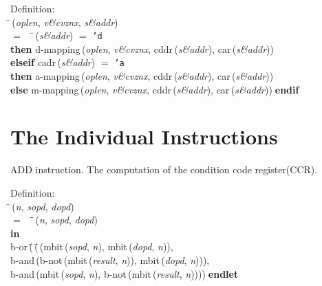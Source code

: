 \begin{tabbing}{\sc Definition}: \\  
\=\,({\it{oplen\/}}, {\it{v\&cvznx\/}}, {\it{s\&addr\/}}) \\ 
$=$$\;\;\;\;$\=\,({\it{s\&addr\/}}) $=$ {\tt{'}}{\tt{d}} \\ 
{\bf then }{\rm{d-mapping}}\,({\it{oplen\/}}, {\it{v\&cvznx\/}}, {\rm{cddr}}\,({\it{s\&addr\/}}), {\rm{car}}\,({\it{s\&addr\/}})) \\ 
{\bf elseif }{\rm{cadr}}\,({\it{s\&addr\/}}) $=$ {\tt{'}}{\tt{a}} \\ 
{\bf then }{\rm{a-mapping}}\,({\it{oplen\/}}, {\it{v\&cvznx\/}}, {\rm{cddr}}\,({\it{s\&addr\/}}), {\rm{car}}\,({\it{s\&addr\/}})) \\ 
{\bf else }{\rm{m-mapping}}\,({\it{oplen\/}}, {\it{v\&cvznx\/}}, {\rm{cddr}}\,({\it{s\&addr\/}}), {\rm{car}}\,({\it{s\&addr\/}}))$\;${\bf  endif}\-\-
\end{tabbing}


 \section{The Individual Instructions}

 ADD instruction.
 The computation of the condition code register(CCR).
\begin{tabbing}{\sc Definition}: \\  
\=\,({\it{n\/}}, {\it{sopd\/}}, {\it{dopd\/}}) \\ 
$=$$\;\;\;\;$\=\=\,({\it{n\/}}, {\it{sopd\/}}, {\it{dopd\/}})\- \\ 
{\bf in} \\ 
{\rm{b-or}}\,(\=\,(\=\,({\rm{mbit}}\,({\it{sopd\/}}, {\it{n\/}}), {\rm{mbit}}\,({\it{dopd\/}}, {\it{n\/}})), \\ 
{\rm{b-and}}\,({\rm{b-not}}\,({\rm{mbit}}\,({\it{result\/}}, {\it{n\/}})), {\rm{mbit}}\,({\it{dopd\/}}, {\it{n\/}})))\-, \\ 
{\rm{b-and}}\,({\rm{mbit}}\,({\it{sopd\/}}, {\it{n\/}}), {\rm{b-not}}\,({\rm{mbit}}\,({\it{result\/}}, {\it{n\/}}))))\-$\;${\bf  endlet}\-\-
\end{tabbing}

